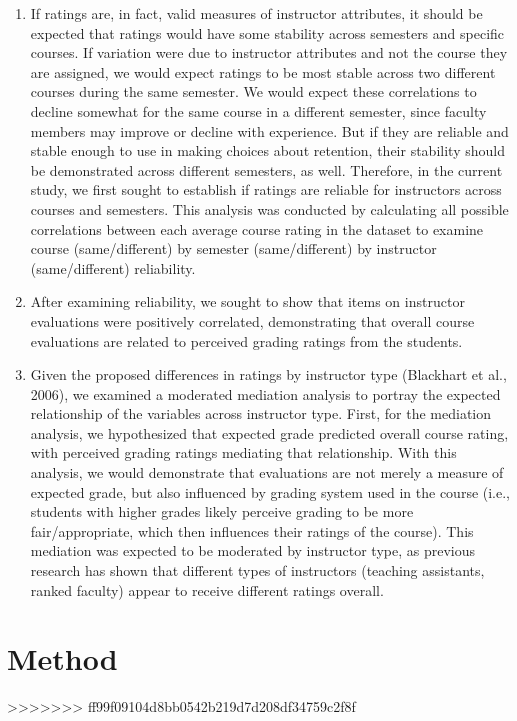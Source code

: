 \documentclass[,man]{apa6}
\theoremstyle{definition}
\theoremstyle{definition}
\theoremstyle{definition}
\theoremstyle{remark}
\begin{document}
\begin{enumerate}
\def\labelenumi{\arabic{enumi})}
\item
  If ratings are, in fact, valid measures of instructor attributes, it
  should be expected that ratings would have some stability across
  semesters and specific courses. If variation were due to instructor
  attributes and not the course they are assigned, we would expect
  ratings to be most stable across two different courses during the same
  semester. We would expect these correlations to decline somewhat for
  the same course in a different semester, since faculty members may
  improve or decline with experience. But if they are reliable and
  stable enough to use in making choices about retention, their
  stability should be demonstrated across different semesters, as well.
  Therefore, in the current study, we first sought to establish if
  ratings are reliable for instructors across courses and semesters.
  This analysis was conducted by calculating all possible correlations
  between each average course rating in the dataset to examine course
  (same/different) by semester (same/different) by instructor
  (same/different) reliability.
\item
  After examining reliability, we sought to show that items on
  instructor evaluations were positively correlated, demonstrating that
  overall course evaluations are related to perceived grading ratings
  from the students.
\item
  Given the proposed differences in ratings by instructor type
  (Blackhart et al., 2006), we examined a moderated mediation analysis
  to portray the expected relationship of the variables across
  instructor type. First, for the mediation analysis, we hypothesized
  that expected grade predicted overall course rating, with perceived
  grading ratings mediating that relationship. With this analysis, we
  would demonstrate that evaluations are not merely a measure of
  expected grade, but also influenced by grading system used in the
  course (i.e., students with higher grades likely perceive grading to
  be more fair/appropriate, which then influences their ratings of the
  course). This mediation was expected to be moderated by instructor
  type, as previous research has shown that different types of
  instructors (teaching assistants, ranked faculty) appear to receive
  different ratings overall.
\end{enumerate}

\hypertarget{method}{%
\section{Method}\label{method}}
>>>>>>> ff99f09104d8bb0542b219d7d208df34759c2f8f
\end{document}

